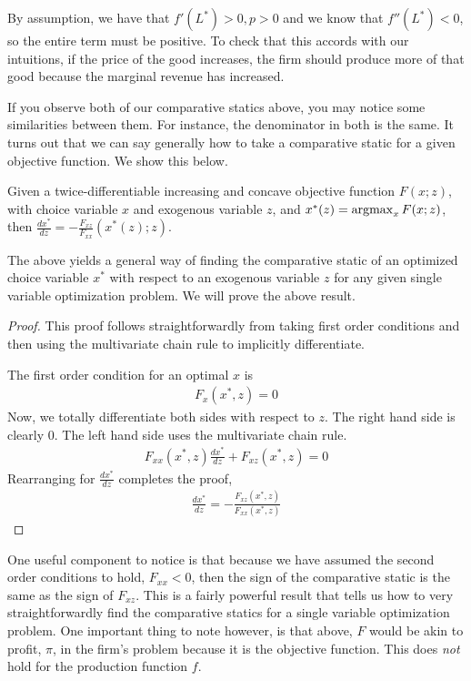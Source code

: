 \begin{description}
    By assumption, we have that $f'(L^*) > 0, p > 0$ and we know that $f''(L^*) < 0$, so the entire term must be positive. To check that this accords with our intuitions, if the price of the good increases, the firm should produce more of that good because the marginal revenue has increased. 
\end{description}

If you observe both of our comparative statics above, you may notice some similarities between them. For instance, the denominator in both is the same. It turns out that we can say generally how to take a comparative static for a given objective function. We show this below.

\begin{proposition*} \label{prop:single_var_static}
    Given a twice-differentiable increasing and concave objective function $F(x; z)$, with choice variable $x$ and exogenous variable $z$, and $x^*(z) = \operatorname*{arg max}_{x} F(x; z)$, then $\frac{dx^*}{dz} = - \frac{F_{xz}}{F_{xx}}(x^*(z); z)$. 
\end{proposition*}

The above yields a general way of finding the comparative static of an optimized choice variable $x^*$ with respect to an exogenous variable $z$ for any given single variable optimization problem. We will prove the above result.

\begin{proof}
    This proof follows straightforwardly from taking first order conditions and then using the multivariate chain rule to implicitly differentiate. 

    The first order condition for an optimal $x$ is
    \begin{align*}
        F_x(x^*, z) = 0
    \end{align*}
    Now, we totally differentiate both sides with respect to $z$. The right hand side is clearly 0. The left hand side uses the multivariate chain rule.
    \begin{align*}
        F_{xx}(x^*, z) \frac{dx^*}{dz} + F_{xz}(x^*, z) = 0
    \end{align*}
    Rearranging for $\frac{dx^*}{dz}$ completes the proof,
    \begin{align*}
        \frac{dx^*}{dz} = -\frac{F_{xz}(x^*, z)}{F_{xx}(x^*, z)}
    \end{align*}
\end{proof}

One useful component to notice is that because we have assumed the second order conditions to hold, $F_{xx} < 0$, then the sign of the comparative static is the same as the sign of $F_{xz}$. This is a fairly powerful result that tells us how to very straightforwardly find the comparative statics for a single variable optimization problem. One important thing to note however, is that above, $F$ would be akin to profit, $\pi$, in the firm's problem because it is the objective function. This does \emph{not} hold for the production function $f$. 

